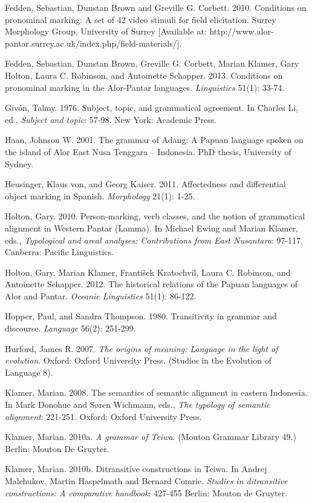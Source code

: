 Fedden, Sebastian, Dunstan Brown and Greville G. Corbett. 2010. Conditions on pronominal marking: A set of 42 video stimuli for field elicitation. Surrey Morphology Group, University of Surrey [Available at: http://www.alor-pantar.surrey.ac.uk/index.php/field-materials/].

Fedden, Sebastian, Dunstan Brown, Greville G. Corbett, Marian Klamer, Gary Holton, Laura C. Robinson, and Antoinette Schapper. 2013. Conditions on pronominal marking in the Alor-Pantar languages. \textit{Linguistics} 51(1): 33-74.

Giv\'on, Talmy. 1976. Subject, topic, and grammatical agreement. In Charles Li, ed., \textit{Subject and topic}: 57-98. New York: Academic Press.

Haan, Johnson W. 2001. The grammar of Adang: A Papuan language spoken on the island of Alor East Nusa Tenggara -- Indonesia\textit{. }PhD thesis, University of Sydney.

Heusinger, Klaus von, and Georg Kaiser. 2011. Affectedness and differential object marking in Spanish. \textit{Morphology} 21(1): 1-25.

Holton, Gary. 2010. Person-marking, verb classes, and the notion of grammatical alignment in Western Pantar (Lamma). In Michael Ewing and Marian Klamer, eds., \textit{Typological and areal analyses: Contributions from East Nusantara}: 97-117. Canberra: Pacific Linguistics.

Holton, Gary, Marian Klamer, Franti\v{s}ek Kratochv\'il, Laura C. Robinson, and Antoinette Schapper. 2012. The historical relations of the Papuan languages of Alor and Pantar. \textit{Oceanic Linguistics} 51(1): 86-122.

Hopper, Paul, and Sandra Thompson. 1980. Transitivity in grammar and discourse. \textit{Language }56(2): 251-299.

Hurford, James R. 2007. \textit{The origins of meaning: Language in the light of evolution}. Oxford: Oxford University Press. (Studies in the Evolution of Language 8).

Klamer, Marian. 2008. The semantics of semantic alignment in eastern Indonesia. In Mark Donohue and S{\o}ren Wichmann, eds., \textit{The typology of semantic alignment}: 221-251. Oxford: Oxford University Press.

Klamer, Marian. 2010a. \textit{A grammar of Teiwa}. (Mouton Grammar Library 49.) Berlin: Mouton De Gruyter.

Klamer, Marian. 2010b. Ditransitive constructions in Teiwa. In Andrej Malchukov, Martin Haspelmath and Bernard Comrie. \textit{Studies in ditransitive constructions: A comparative handbook}: 427-455 Berlin: Mouton de Gruyter.

